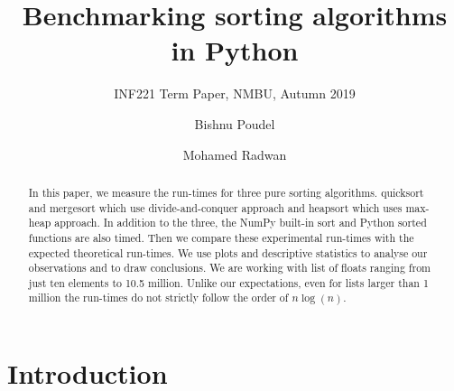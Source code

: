 \documentclass[sigconf, nonacm, natbib, screen, balance=False]{acmart}
\begin{document}
\title{Benchmarking sorting algorithms in Python}
\subtitle{INF221 Term Paper, NMBU, Autumn 2019}

\author{Bishnu Poudel}

\author{Mohamed Radwan}

\begin{abstract}

In this paper, we measure the run-times for three pure sorting algorithms. quicksort and mergesort which use divide-and-conquer approach and heapsort which uses max-heap approach. In addition to the three, the NumPy built-in sort and Python sorted functions are also timed. Then we compare these experimental run-times with the expected theoretical run-times. We use plots and descriptive statistics to analyse our observations and to draw conclusions. We are working with list of floats ranging from just ten elements to 10.5 million. Unlike our expectations, even for lists larger than 1 million the run-times do not strictly follow the order of $n\log(n)$.
\end{abstract}
\maketitle
\section{Introduction}\label{sec:intro}
\end{document}
